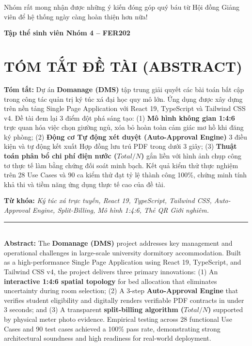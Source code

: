 \documentclass[12pt,a4paper,oneside]{report}
\begin{document}
Nhóm rất mong nhận được những ý kiến đóng góp quý báu từ Hội đồng Giảng viên để hệ thống ngày càng hoàn thiện hơn nữa!

\vspace{1.5cm}
\begin{flushright}
\textbf{Tập thể sinh viên Nhóm 4 -- FER202}
\end{flushright}

\newpage
\chapter*{TÓM TẮT ĐỀ TÀI (ABSTRACT)}

\textbf{Tóm tắt:} Dự án \textbf{Domanage (DMS)} tập trung giải quyết các bài toán bất cập trong công tác quản trị ký túc xá đại học quy mô lớn. Ứng dụng được xây dựng trên nền tảng Single Page Application với React 19, TypeScript và Tailwind CSS v4. Đề tài đem lại 3 điểm đột phá sáng tạo: (1) \textbf{Mô hình không gian 1:4:6} trực quan hóa việc chọn giường ngủ, xóa bỏ hoàn toàn cảm giác mơ hồ khi đăng ký phòng; (2) \textbf{Động cơ Tự động xét duyệt (Auto-Approval Engine)} 3 điều kiện và tự động kết xuất Hợp đồng lưu trú PDF trong dưới 3 giây; (3) \textbf{Thuật toán phân bổ chi phí điện nước ($Total / N$)} gắn liền với hình ảnh chụp công tơ thực tế làm bằng chứng đối soát minh bạch. Kết quả kiểm thử thực nghiệm trên 28 Use Cases và 90 ca kiểm thử đạt tỷ lệ thành công 100\%, chứng minh tính khả thi và tiềm năng ứng dụng thực tế cao của đề tài.

\vspace{0.8cm}
\noindent \textbf{Từ khóa:} \textit{Ký túc xá trực tuyến, React 19, TypeScript, Tailwind CSS, Auto-Approval Engine, Split-Billing, Mô hình 1:4:6, Thẻ QR Giới nghiêm.}

\vspace{1.5cm}
\noindent \rule{\textwidth}{0.5pt}\\[0.5cm]

\textbf{Abstract:} The \textbf{Domanage (DMS)} project addresses key management and operational challenges in large-scale university dormitory accommodation. Built as a high-performance Single Page Application using React 19, TypeScript, and Tailwind CSS v4, the project delivers three primary innovations: (1) An \textbf{interactive 1:4:6 spatial topology} for bed allocation that eliminates uncertainty during room selection; (2) A 3-step \textbf{Auto-Approval Engine} that verifies student eligibility and digitally renders verifiable PDF contracts in under 3 seconds; and (3) A transparent \textbf{split-billing algorithm ($Total / N$)} supported by physical meter photo evidence. Empirical testing across 28 functional Use Cases and 90 test cases achieved a 100\% pass rate, demonstrating strong architectural soundness and high readiness for real-world deployment.
\end{document}
